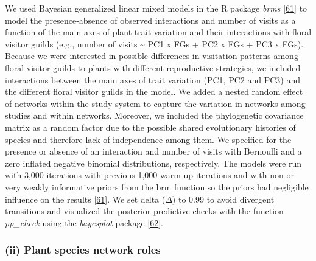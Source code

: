 \documentclass[
  12pt,
  a4paper,
]{article}
\begin{document}
We used Bayesian generalized linear mixed models in the R package \emph{brms} {[}\protect\hyperlink{ref-burkner2017}{61}{]} to model the presence-absence of observed interactions and number of visits as a function of the main axes of plant trait variation and their interactions with floral visitor guilds (e.g., number of visits \textasciitilde{} PC1 x FGs + PC2 x FGs + PC3 x FGs). Because we were interested in possible differences in visitation patterns among floral visitor guilds to plants with different reproductive strategies, we included interactions between the main axes of trait variation (PC1, PC2 and PC3) and the different floral visitor guilds in the model. We added a nested random effect of networks within the study system to capture the variation in networks among studies and within networks. Moreover, we included the phylogenetic covariance matrix as a random factor due to the possible shared evolutionary histories of species and therefore lack of independence among them. We specified for the presence or absence of an interaction and number of visits with Bernoulli and a zero inflated negative binomial distributions, respectively. The models were run with 3,000 iterations with previous 1,000 warm up iterations and with non or very weakly informative priors from the brm function so the priors had negligible influence on the results {[}\protect\hyperlink{ref-burkner2017}{61}{]}. We set delta (\(\Delta\)) to 0.99 to avoid divergent transitions and visualized the posterior predictive checks with the function \emph{pp\_check} using the \emph{bayesplot} package {[}\protect\hyperlink{ref-gabry2019}{62}{]}.

\hypertarget{ii-plant-species-network-roles}{%
\subsubsection{(ii) Plant species network roles}\label{ii-plant-species-network-roles}}
\end{document}
